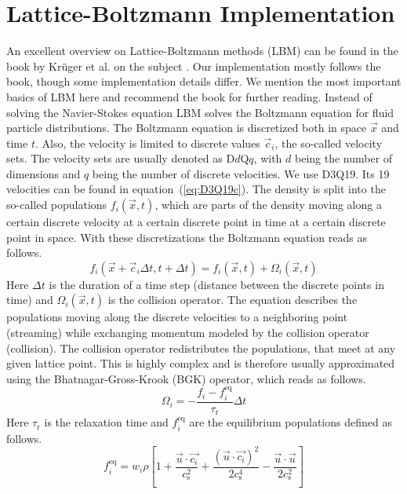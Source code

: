 \documentclass[a4paper,12pt]{scrartcl}
\begin{document}
	\section{Lattice-Boltzmann Implementation}\label{app:LBM}
	An excellent overview on Lattice-Boltzmann methods (LBM) can be found in the book by Krüger et al. on the subject \cite{Kruger_book}.
	Our implementation mostly follows the book, though some implementation details differ.
	We mention the most important basics of LBM here and recommend the book for further reading.
	Instead of solving the Navier-Stokes equation LBM solves the Boltzmann equation for fluid particle distributions.
	The Boltzmann equation is discretized both in space $\vec{x}$ and time $t$.
	Also, the velocity is limited to discrete values $\vec{c}_i$, the so-called velocity sets.
	The velocity sets are usually denoted as D$d$Q$q$, with $d$ being the number of dimensions and $q$ being the number of discrete velocities.
	We use D3Q19. Its 19 velocities can be found in equation~(\ref{eq:D3Q19c}).
	The density is split into the so-called populations $f_i\left(\vec{x}, t\right)$, which are parts of the density moving along a certain discrete velocity at a certain discrete point in time at a certain discrete point in space.
	With these discretizations the Boltzmann equation reads as follows.
	\begin{equation}
		f_i\left(\vec{x}+\vec{c}_i\Delta t, t+\Delta t\right) = f_i\left(\vec{x}, t\right) + \Omega_i\left(\vec{x}, t\right)
	\end{equation}
	Here $\Delta t$ is the duration of a time step (distance between the discrete points in time) and $\Omega_i\left(\vec{x}, t\right)$ is the collision operator.
	The equation describes the populations moving along the discrete velocities to a neighboring point (streaming) while exchanging momentum modeled by the collision operator (collision).
	The collision operator redistributes the populations, that meet at any given lattice point.
	This is highly complex and is therefore usually approximated using the Bhatnagar-Gross-Krook (BGK) operator, which reads as follows.
	\begin{equation}
		\Omega_i = - \frac{f_i - f_i^\text{eq}}{\tau_\text{r}}\Delta t
	\end{equation}
	Here $\tau_\text{r}$ is the relaxation time and $f_i^\text{eq}$ are the equilibrium populations defined as follows.
	\begin{equation}
		f_i^\text{eq} = w_i\rho\left[1 + \frac{\vec{u}\cdot\vec{c_i}}{c_\text{s}^2} + \frac{\left(\vec{u}\cdot\vec{c_i}\right)^2}{2c_\text{s}^4} - \frac{\vec{u}\cdot\vec{u}}{2c_\text{s}^2}\right]
	\end{equation}
\end{document}
